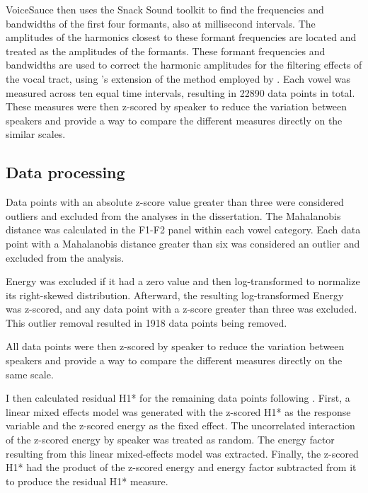 VoiceSauce then uses the Snack Sound toolkit \citep{sjolanderSnackSoundToolkit2004} to find the frequencies and bandwidths of the first four formants, also at millisecond intervals. The amplitudes of the harmonics closest to these formant frequencies are located and treated as the amplitudes of the formants. These formant frequencies and bandwidths are used to correct the harmonic amplitudes for the filtering effects of the vocal tract, using \citeauthor{iseliAgeSexVowel2007}'s \citeyear{iseliAgeSexVowel2007} extension of the method employed by \citet{hansonGlottalCharacteristicsFemale1997}. Each vowel was measured across ten equal time intervals, resulting in 22890 data points in total. These measures were then z-scored by speaker to reduce the variation between speakers and provide a way to compare the different measures directly on the similar scales.

\subsection{Data processing} \label{sec:acousticlandscape:data_processing}
Data points with an absolute z-score value greater than three were considered outliers and excluded from the analyses in the dissertation. The Mahalanobis distance was calculated in the F1-F2 panel within each vowel category. Each data point with a Mahalanobis distance greater than six was considered an outlier and excluded from the analysis.  

Energy was excluded if it had a zero value and then log-transformed to normalize its right-skewed distribution. Afterward, the resulting log-transformed Energy was z-scored, and any data point with a z-score greater than three was excluded. This outlier removal resulted in 1918 data points being removed. 

All data points were then z-scored by speaker to reduce the variation between speakers and provide a way to compare the different measures directly on the same scale.

I then calculated residual H1* for the remaining data points following \citet{chaiH1H2AcousticMeasure2022}. First, a linear mixed effects model was generated with the z-scored H1* as the response variable and the z-scored energy as the fixed effect. The uncorrelated interaction of the z-scored energy by speaker was treated as random. The energy factor resulting from this linear mixed-effects model was extracted. Finally, the z-scored H1* had the product of the z-scored energy and energy factor subtracted from it to produce the residual H1* measure. 

